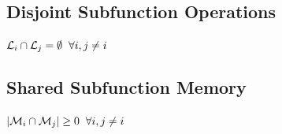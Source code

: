 \documentclass[11pt]{article}
\begin{document}



\subsection{Disjoint Subfunction Operations}
\begin{center}
$
\mathcal{L}_i \cap \mathcal{L}_j = \emptyset \hspace{2mm} \forall i,j\neq i
$
\end{center}

\subsection{Shared Subfunction Memory}
\begin{center}
$
|\mathcal{M}_i \cap \mathcal{M}_j| \geq 0 \hspace{2mm} \forall i,j\neq i
$
\end{center}
\end{document}
